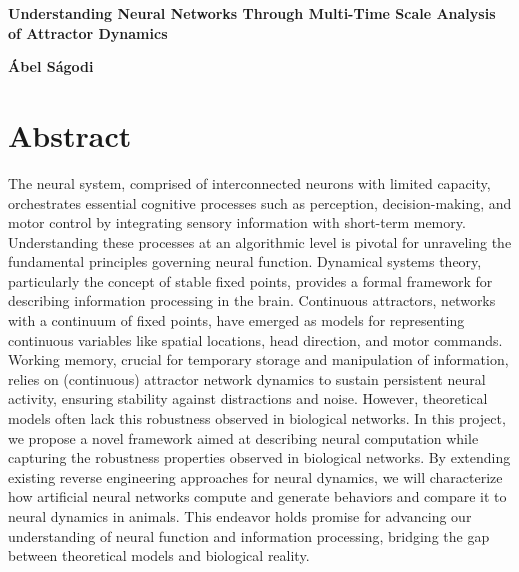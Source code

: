 \documentclass[12pt,letterpaper, onecolumn]{article}
\theoremstyle{definition}
\theoremstyle{remark}
\begin{document}

\begin{center}
\LARGE{\bf   Understanding Neural Networks Through Multi-Time Scale Analysis of Attractor Dynamics}
\end{center}
\begin{center}
{\textbf{\'Abel S\'agodi}}
\end{center}

\section*{Abstract}

The neural system, comprised of interconnected neurons with limited capacity, orchestrates essential cognitive processes such as perception, decision-making, and motor control by integrating sensory information with short-term memory.
Understanding these processes at an algorithmic level is pivotal for unraveling the fundamental principles governing neural function.
Dynamical systems theory, particularly the concept of stable fixed points, provides a formal framework for describing information processing in the brain.
Continuous attractors, networks with a continuum of fixed points, have emerged as models for representing continuous variables like spatial locations, head direction, and motor commands. 
Working memory, crucial for temporary storage and manipulation of information, relies on (continuous) attractor network dynamics to sustain persistent neural activity, ensuring stability against distractions and noise.
However, theoretical models often lack this robustness observed in biological networks.
In this project, we propose a novel framework aimed at describing neural computation while capturing the robustness properties observed in biological networks. By extending existing reverse engineering approaches for neural dynamics, we will characterize how artificial neural networks compute and generate behaviors and compare it to neural dynamics in animals. This endeavor holds promise for advancing our understanding of neural function and information processing, bridging the gap between theoretical models and biological reality.
\end{document}
